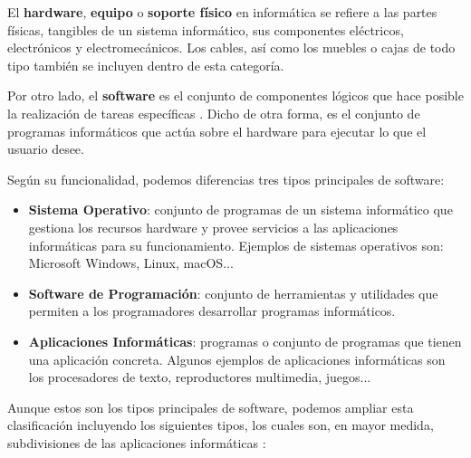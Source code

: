 El {\bfseries hardware}, {\bfseries equipo} o {\bfseries soporte físico} en informática se refiere a las partes físicas, tangibles de un sistema informático, sus componentes eléctricos, electrónicos y electromecánicos. Los cables, así como los muebles o cajas de todo tipo también se incluyen dentro de esta categoría. \cite{wiki01}

Por otro lado, el {\bfseries software} es el conjunto de componentes lógicos que hace posible la realización de tareas específicas \cite{wiki02}. Dicho de otra forma, es el conjunto de programas informáticos que actúa sobre el hardware para ejecutar lo que el usuario desee.

Según su funcionalidad, podemos diferencias tres tipos principales de software:

\begin{itemize}
    \item {\bfseries Sistema Operativo}: conjunto de programas de un sistema informático que gestiona los recursos hardware y provee servicios a las aplicaciones informáticas para su funcionamiento. Ejemplos de sistemas operativos son: \gls{Microsoft Windows}, \gls{Linux}, \gls{macOS}...
    \item {\bfseries Software de Programación}: conjunto de herramientas y utilidades que permiten a los programadores desarrollar programas informáticos.
    \item {\bfseries Aplicaciones Informáticas}: programas o conjunto de programas que tienen una aplicación concreta. Algunos ejemplos de aplicaciones informáticas son los procesadores de texto, reproductores multimedia, juegos...
\end{itemize}

Aunque estos son los tipos principales de software, podemos ampliar esta clasificación incluyendo los siguientes tipos, los cuales son, en mayor medida, subdivisiones de las aplicaciones informáticas \cite{tipos}:

